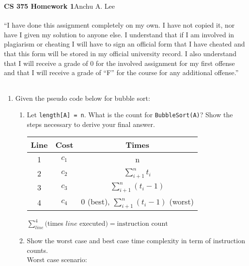 \documentclass{article}
\begin{document}
        \noindent\textbf{CS 375 Homework 1}\hfill Anchu A. Lee
        \\\\“I have done this assignment completely on my own. I have not copied it, nor have I given my solution to anyone else. I understand that if I am involved in plagiarism or cheating I will have to sign an official form that I have cheated and that this form will be stored in my official university record. I also understand that I will receive a grade of 0 for the involved assignment for my first offense and that I will receive a grade of “F” for the course for any additional offense.” 
        \\\\
        \begin{enumerate}
            \item Given the pseudo code below for bubble sort:
                \begin{enumerate}
                    \item Let \verb|length[A] = n|. What is the count for \verb|BubbleSort(A)|? Show the steps necessary to derive your final answer. 
                        \begin{center}
                            \begin{tabular}{|c c c|}
                                \hline
                                Line & Cost & Times\\[0.5ex]
                                \hline\hline
                                1 & $c_1$ & n\\
                                \hline
                                2 & $c_2$ & $\sum_{i+1}^{n}t_i$\\
                                \hline
                                3 & $c_3$ & $\sum_{i+1}^{n}(t_i-1)$\\
                                \hline
                                4 & $c_4$ & 0 (best), $\sum_{i+1}^{n}(t_i-1)$ (worst) \\
                                \hline
                            \end{tabular}
                        \end{center}
                        $\sum_{line}^4($times $line$ executed$) = \text{instruction count}$\\
                    \item Show the worst case and best case time complexity in term of instruction counts.\\
                    Worst case scenario:\\

\end{enumerate}
\end{enumerate}
\end{document}
